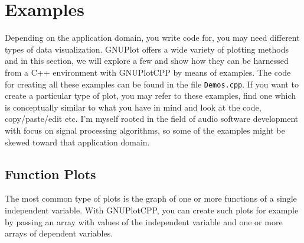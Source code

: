 \documentclass[11pt]{article}
\begin{document}



\section{Examples}
Depending on the application domain, you write code for, you may need different types of data visualization. GNUPlot offers a wide variety of plotting methods and in this section, we will explore a few and show how they can be harnessed from a C++ environment with GNUPlotCPP by means of examples. The code for creating all these examples can be found in the file \texttt{Demos.cpp}. If you want to create a particular type of plot, you may refer to these examples, find one which is conceptually similar to what you have in mind and look at the code, copy/paste/edit etc. I'm myself rooted in the field of audio software development with focus on signal processing algorithms, so some of the examples might be skewed toward that application domain.

\subsection{Function Plots}
The most common type of plots is the graph of one or more functions of a single independent variable. With GNUPlotCPP, you can create such plots for example by passing an array with values of the independent variable and one or more arrays of dependent variables. 
\end{document}
